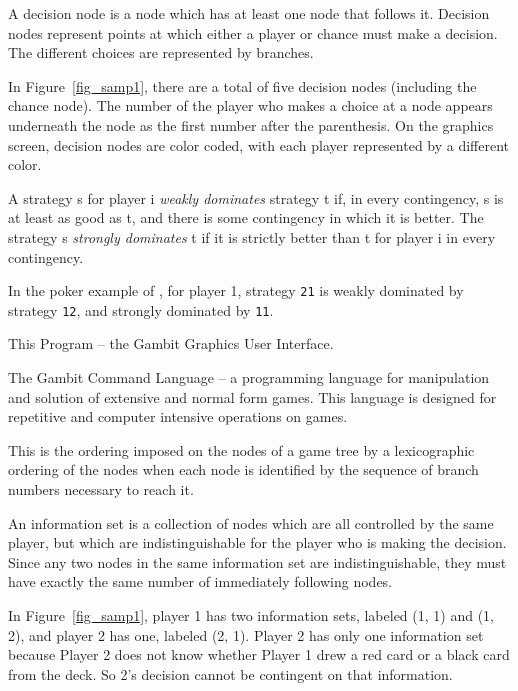 {\begin{helpglossary}
\label{decnodegloss}
A decision node is a node which has at least one node that follows it.  
Decision nodes represent points at which either a player or chance must 
make a decision.  The different choices are represented by branches.

In Figure~\ref{fig_samp1}, there are a total of five decision nodes (including the chance node). 
 The number of the player who makes a choice at a node appears underneath the
node as the first number after the parenthesis.  On the graphics screen,
decision nodes are color coded, with each player represented by a
different color.

\label{dominationgloss}
A strategy s for player i 
{\em weakly dominates} strategy t if, in every contingency, s 
is at least as good as t, and there is some contingency in which it is 
better.  The strategy s {\em strongly dominates} t if it is 
strictly better than t for player i in every contingency.  

In the poker example of , 
for player 1, strategy \verb+21+ is weakly dominated by strategy \verb+12+, 
and strongly dominated by \verb+11+. 

\label{guigloss}
This Program -- the Gambit Graphics User Interface.

\label{gclgloss}
The Gambit Command Language -- a programming language for manipulation and
solution of extensive and normal form games.  This language is designed
for repetitive and computer intensive operations on games.  

\label{indextravgloss}
This is the ordering imposed on the nodes of a game tree by a lexicographic 
ordering of the nodes when each node is identified by the sequence of branch 
numbers necessary to reach it.  

\label{infosetgloss}
An information set is a collection of nodes which are all controlled by
the same player, but which are indistinguishable 
for the player who is making the decision.  Since any two nodes 
in the same information set are indistinguishable, they must have exactly 
the same number of immediately following nodes. 

In Figure~\ref{fig_samp1}, player 1 has two information
sets, labeled (1, 1) and (1, 2), and player 2 has one, labeled (2, 1).
Player 2 has only one information set because Player 2 does not know whether
 Player 1 drew a red card or a black card from the deck.  So 2's decision 
cannot be contingent on that information.


\end{helpglossary}}
